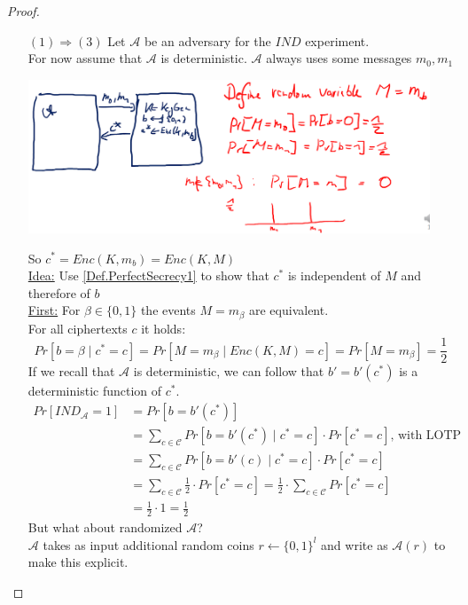 \begin{proof}
\begin{itemize}
				\item[$(1) \Rightarrow (3)$]
					Let $\mathcal{A}$ be an adversary for the $IND$ experiment.\\
					For now assume that $\mathcal{A}$ is deterministic.
					$\mathcal{A}$ always uses some messages $m_0,m_1$
    				\begin{center}
						\includegraphics[width=120mm]{Graphics/Perfect Secrecy/Proof(1)to(3).png}\newline
					\end{center}
					So $c^* = Enc(K,m_b) = Enc(K,M)$\\
					\underline{Idea:} Use \cref{Def.PerfectSecrecy1} to show that $c^*$ is independent of $M$ and therefore of $b$\\
					\underline{First:} For $\beta \in \{0,1\}$ the events $M = m_{\beta}$ are equivalent.\\
					For all ciphertexts $c$ it holds:
						$$Pr[b = \beta \mid c^* = c] = Pr[M = m_{\beta} \mid Enc(K,M)=c] = Pr[M = m_{\beta}] = \frac{1}{2}$$
					If we recall that $\mathcal{A}$ is deterministic, we can follow that $b' = b'(c^*)$ is a deterministic function of $c^*$.
					\begin{align*}
						Pr[IND_{\mathcal{A}} = 1] &= Pr[b = b'(c^*)]\\
						&= \sum\limits_{c \in \mathcal{C}} Pr[b = b'(c^*) \mid c^* = c] \cdot Pr[c^* = c] \text{, with LOTP}\\
						&= \sum\limits_{c \in \mathcal{C}} Pr[b = b'(c) \mid c^* = c] \cdot Pr[c^* = c]\\
						&= \sum\limits_{c \in \mathcal{C}} \frac{1}{2} \cdot Pr[c^* = c] = \frac{1}{2} \cdot \sum\limits_{c \in \mathcal{C}} Pr[c^* = c]\\
						&= \frac{1}{2} \cdot 1 = \frac{1}{2}
					\end{align*}
					But what about randomized $\mathcal{A}$?\\
					$\mathcal{A}$ takes as input additional random coins $r \leftarrow \{0,1\}^l$ and write as $\mathcal{A}(r)$ to make this explicit.\\

\end{itemize}
\end{proof}

